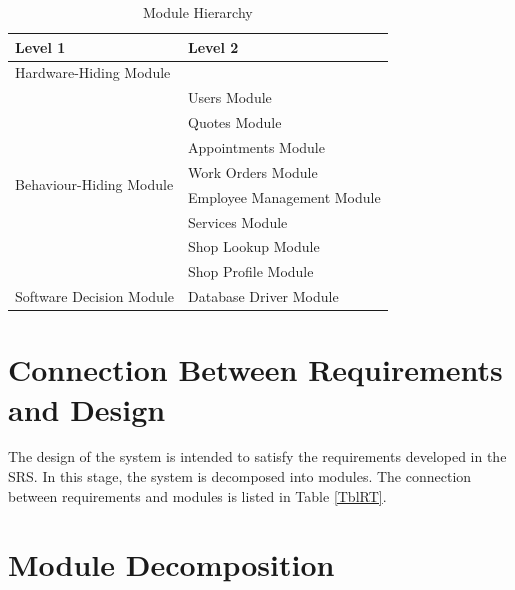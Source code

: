 \documentclass[12pt, titlepage]{article}
\begin{document}
\begin{table}[H]
	\centering
	\begin{tabular}{p{} p{}}
		\toprule
		\textbf{Level 1}                                      & \textbf{Level 2}           \\
		\midrule

		Hardware-Hiding Module                                & ~                          \\

		\midrule

		\multirow{8}{0.3\textwidth}{Behaviour-Hiding Module}  & Users Module               \\
		                                                      & Quotes Module              \\
		                                                      & Appointments Module        \\
		                                                      & Work Orders Module         \\
		                                                      & Employee Management Module \\
		                                                      & Services Module            \\
		                                                      & Shop Lookup Module         \\
		                                                      & Shop Profile Module        \\
		\midrule

		\multirow{1}{0.3\textwidth}{Software Decision Module} & Database Driver Module     \\

		\bottomrule
	\end{tabular}
	\caption{Module Hierarchy}
	\label{TblMH}
\end{table}

\section{Connection Between Requirements and Design} \label{SecConnection}

The design of the system is intended to satisfy the requirements developed in the SRS. In this
stage, the system is decomposed into modules. The connection between requirements and modules is
listed in Table \ref{TblRT}.

\section{Module Decomposition} \label{SecMD}
\end{document}
